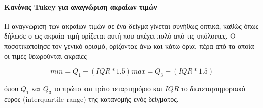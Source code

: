 \paragraph{Κανόνας Tukey για αναγνώριση ακραίων τιμών} Η αναγνώριση των ακραίων τιμών σε ένα δείγμα γίνεται συνήθως οπτικά, καθώς όπως δήλωσε ο \citet{Grubbs} ως ακραία τιμή ορίζεται αυτή που απέχει πολύ από τις υπόλοιπες. \label{eq:tukey}Ο \citet{Tukey} ποσοτικοποίησε τον γενικό ορισμό, ορίζοντας άνω και κάτω όρια, πέρα από τα οποία οι τιμές θεωρούνται ακραίες

\begin{equation}
\label{eq:tukey}
min =  Q_1 - (IQR * 1.5)
max =  Q_3 + (IQR * 1.5)
\end{equation}

όπου $Q_1$ και $Q_3$ το πρώτο και τρίτο τεταρτημόριο και $IQR$ το διατεταρτημοριακό εύρος (interquar\-tile range) της κατανομής ενός δείγματος. 
